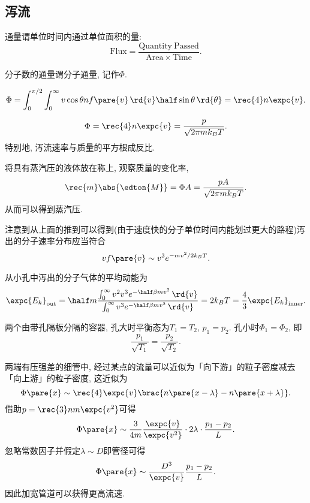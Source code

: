 \documentclass[../Thermal.tex]{subfiles}
\begin{document}
\subsection{泻流}
\begin{definition}[通量]
通量谓单位时间内通过单位面积的量:
\[ \mathrm{Flux} = \frac{\mathrm{Quantity\ Passed}}{\mathrm{Area} \times \mathrm{Time}}. \]
\end{definition}
\begin{definition}[分子通量]
分子数的通量谓分子通量, 记作$\Phi$.
\end{definition}
\[ \Phi = \int_0^{\pi/2}\int_0^\infty v\cos\theta nf\pare{v}\,\rd{v}\half\sin\theta\,\rd{\theta} = \rec{4}n\expc{v}. \]
\begin{finale}
\[ \Phi = \rec{4}n\expc{v} = \frac{p}{\sqrt{2\pi mk_B T}}. \]
特别地, 泻流速率与质量的平方根成反比.
\end{finale}
\begin{ex}[Knudsen方法]
将具有蒸汽压的液体放在称上, 观察质量的变化率,
\[ \rec{m}\abs{\edton{M}} = \Phi A = \frac{pA}{\sqrt{2\pi mk_B T}}.  \]
从而可以得到蒸汽压.
\end{ex}
注意到从上面的推到可以得到(由于速度快的分子单位时间内能划过更大的路程)泻出的分子速率分布应当符合
\[ v f\pare{v} \sim v^3 e^{-mv^2/2k_BT}. \]
\begin{ex}
从小孔中泻出的分子气体的平均动能为
\[ \expc{E_k}_{\text{out}} = \half m\frac{\int_0^\infty v^2v^3e^{-\half \beta mv^2}\,\rd{v}}{\int_0^\infty v^3 e^{-\half \beta mv^2}\,\rd{v}} = 2k_BT = \frac{4}{3}\expc{E_k}_{\text{inner}}. \]
\end{ex}
\begin{ex}
两个由带孔隔板分隔的容器, 孔大时平衡态为$T_1=T_2$, $p_1 = p_2$. 孔小时$\Phi_1 = \Phi_2$, 即
\[ \frac{p_1}{\sqrt{T_1}} = \frac{p_2}{\sqrt{T_2}}. \]
\end{ex}
\begin{ex}[Knudesen流动]
两端有压强差的细管中, 经过某点的流量可以近似为「向下游」的粒子密度减去「向上游」的粒子密度, 这近似为
\[ \Phi\pare{x} \sim \rec{4} \expc{v} \brac{n\pare{x-\lambda} - n\pare{x+\lambda}}. \]
借助$p = \rec{3}nm\expc{v^2}$可得
\[ \Phi\pare{x} \sim \frac{3}{4m}\frac{\expc{v}}{\expc{v^2}} \cdot 2\lambda \cdot\frac{p_1 - p_2}{L}. \]
忽略常数因子并假定$\lambda \sim D$即管径可得
\[ \Phi\pare{x} \sim \frac{D^3}{\expc{v}}\frac{p_1-p_2}{L}. \]
因此加宽管道可以获得更高流速.
\end{ex}
\end{document}

